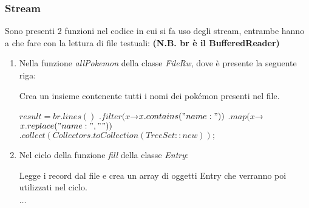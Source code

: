 \documentclass{article}
\begin{document}
\vspace{5pt}

\subsubsection{Stream}

Sono presenti 2 funzioni nel codice in cui si fa uso degli stream, entrambe hanno a che fare con la lettura di file testuali: \newline\textbf{(N.B. br è il BufferedReader)}

\vspace{5pt}
\begin{enumerate}
    \item Nella funzione \textit{allPokemon} della classe \textit{FileRw}, dove è presente la seguente riga: 
    \begin{algorithm}
    \label{alg:str1}
    \caption{Crea un insieme contenente tutti i nomi dei pokémon presenti nel file.}
    \begin{algorithmic}[ht]
    \Statex $result = br.lines()$ 
    \State\hspace{\algorithmicindent}$.filter(x $→$ x.contains("name:"))$
    \State\hspace{\algorithmicindent}$.map(x $→$ x.replace("name:",""))$
    \State\hspace{\algorithmicindent}$.collect(Collectors.toCollection(TreeSet::new));$
    \end{algorithmic}
    \end{algorithm}

    \vspace{5pt}

\item Nel ciclo della funzione \textit{fill} della classe \textit{Entry}:
    \begin{algorithm}
    \label{alg:str2}
    \caption{Legge i record dal file e crea un array di oggetti Entry che verranno poi utilizzati nel ciclo.}
    \begin{algorithmic}[ht]
        \State ${\ldots}$
        \EndFor
    \end{algorithmic}
    \end{algorithm}
    
\end{enumerate}
\end{document}
